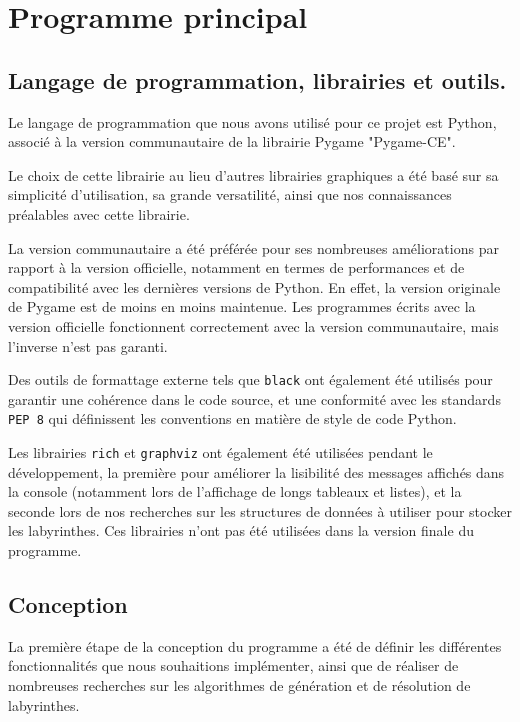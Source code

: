 \documentclass[12pt]{scrreprt} %
\begin{document}
\section{Programme principal}

\subsection{Langage de programmation, librairies et outils.}

Le langage de programmation que nous avons utilisé pour ce projet est Python, associé à la version communautaire de la librairie Pygame "Pygame-CE"\cite{PygameGithub2024}.

Le choix de cette librairie au lieu d'autres librairies graphiques a été basé sur sa simplicité d'utilisation, sa grande versatilité, ainsi que nos connaissances préalables avec cette librairie.

La version communautaire a été préférée pour ses nombreuses améliorations par rapport à la version officielle, notamment en termes de performances et de compatibilité avec les dernières versions de Python. En effet, la version originale de Pygame est de moins en moins maintenue. Les programmes écrits avec la version officielle fonctionnent correctement avec la version communautaire, mais l'inverse n'est pas garanti.

Des outils de formattage externe tels que \texttt{black}\cite{Black2024} ont également été utilisés pour garantir une cohérence dans le code source, et une conformité avec les standards \texttt{PEP 8}\cite{PEP82024} qui définissent les conventions en matière de style de code Python.

Les librairies \texttt{rich} et \texttt{graphviz} ont également été utilisées pendant le développement, la première pour améliorer la lisibilité des messages affichés dans la console (notamment lors de l'affichage de longs tableaux et listes), et la seconde lors de nos recherches sur les structures de données à utiliser pour stocker les labyrinthes. Ces librairies n'ont pas été utilisées dans la version finale du programme.

\subsection{Conception}

La première étape de la conception du programme a été de définir les différentes fonctionnalités que nous souhaitions implémenter, ainsi que de réaliser de nombreuses recherches sur les algorithmes de génération et de résolution de labyrinthes.
\end{document}
